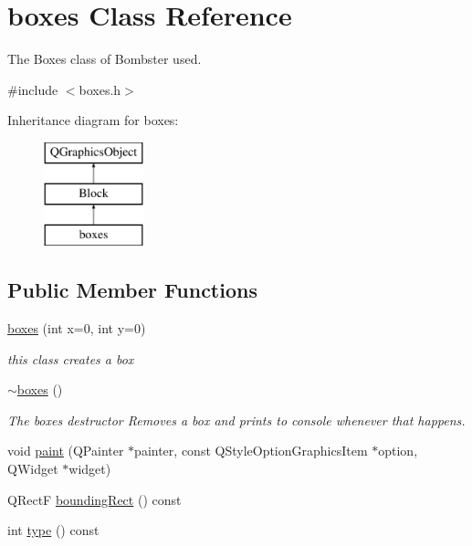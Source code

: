 \hypertarget{classboxes}{\section{boxes Class Reference}
\label{classboxes}
}


The Boxes class of Bombster used.  




{\ttfamily \#include $<$boxes.\-h$>$}

Inheritance diagram for boxes\-:\begin{figure}[H]
\begin{center}
\leavevmode
\includegraphics[height=3.000000cm]{classboxes}
\end{center}
\end{figure}
\subsection*{Public Member Functions}
\begin{DoxyCompactItemize}
\item 
\hyperlink{classboxes_a093427b27f4b84a803544cb738dc12e6}{boxes} (int x=0, int y=0)
\begin{DoxyCompactList}\small\item\em this class creates a box \end{DoxyCompactList}\item 
\hyperlink{classboxes_a7d70921b4fe775ad313ac80d6da55222}{$\sim$boxes} ()
\begin{DoxyCompactList}\small\item\em The boxes destructor Removes a box and prints to console whenever that happens. \end{DoxyCompactList}\item 
void \hyperlink{classboxes_aa07b0460f8be5da676c4369331061fa6}{paint} (Q\-Painter $\ast$painter, const Q\-Style\-Option\-Graphics\-Item $\ast$option, Q\-Widget $\ast$widget)
\item 
Q\-Rect\-F \hyperlink{classboxes_a4855400f92db9ebe776a79c79bac1d50}{bounding\-Rect} () const 
\item 
int \hyperlink{classboxes_abc3e99501e6d9108c0fa115214b0e14e}{type} () const 
\end{DoxyCompactItemize}

